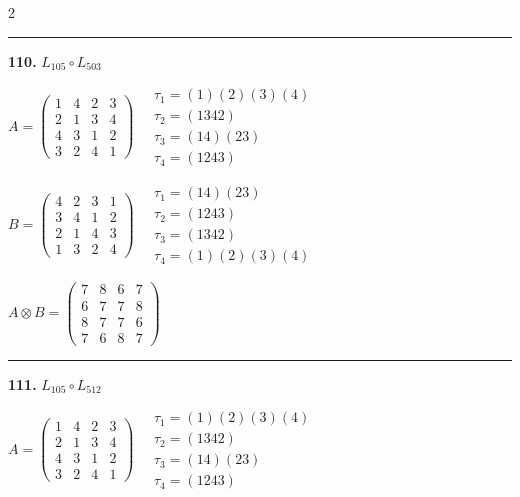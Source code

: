 \begin{multicols}{2}
\vspace{0.3em}
\hrule
\vspace{0.3em}

\noindent\textbf{110.} $L_{105} \circ L_{503}$

$A = \begin{pmatrix} 1 & 4 & 2 & 3 \\ 2 & 1 & 3 & 4 \\ 4 & 3 & 1 & 2 \\ 3 & 2 & 4 & 1 \end{pmatrix} \quad \begin{matrix} \tau_{1}=(1)(2)(3)(4) \\ \tau_{2}=(1 3 4 2) \\ \tau_{3}=(1 4)(2 3) \\ \tau_{4}=(1 2 4 3) \end{matrix}$

$B = \begin{pmatrix} 4 & 2 & 3 & 1 \\ 3 & 4 & 1 & 2 \\ 2 & 1 & 4 & 3 \\ 1 & 3 & 2 & 4 \end{pmatrix} \quad \begin{matrix} \tau_{1}=(1 4)(2 3) \\ \tau_{2}=(1 2 4 3) \\ \tau_{3}=(1 3 4 2) \\ \tau_{4}=(1)(2)(3)(4) \end{matrix}$

$A \otimes B = \begin{pmatrix} 7 & 8 & 6 & 7 \\ 6 & 7 & 7 & 8 \\ 8 & 7 & 7 & 6 \\ 7 & 6 & 8 & 7 \end{pmatrix}$

\vspace{0.3em}
\hrule
\vspace{0.3em}

\noindent\textbf{111.} $L_{105} \circ L_{512}$

$A = \begin{pmatrix} 1 & 4 & 2 & 3 \\ 2 & 1 & 3 & 4 \\ 4 & 3 & 1 & 2 \\ 3 & 2 & 4 & 1 \end{pmatrix} \quad \begin{matrix} \tau_{1}=(1)(2)(3)(4) \\ \tau_{2}=(1 3 4 2) \\ \tau_{3}=(1 4)(2 3) \\ \tau_{4}=(1 2 4 3) \end{matrix}$


\end{multicols}
